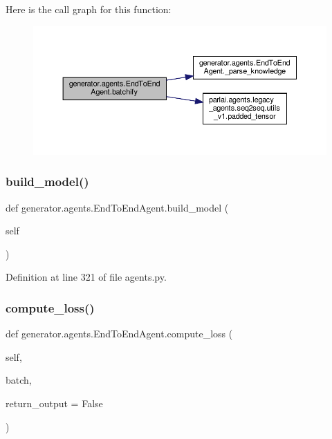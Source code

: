 Here is the call graph for this function\+:
\nopagebreak
\begin{figure}[H]
\begin{center}
\leavevmode
\includegraphics[width=350pt]{classgenerator_1_1agents_1_1EndToEndAgent_a91da888e366d029cb5efa373d4858e15_cgraph}
\end{center}
\end{figure}
\mbox{\label{classgenerator_1_1agents_1_1EndToEndAgent_a4350bfc0d04bf47814db2d14b95ac3bb}} 
\subsubsection{\texorpdfstring{build\+\_\+model()}{build\_model()}}
{\footnotesize\ttfamily def generator.\+agents.\+End\+To\+End\+Agent.\+build\+\_\+model (\begin{DoxyParamCaption}\item[{}]{self }\end{DoxyParamCaption})}



Definition at line 321 of file agents.\+py.

\mbox{\label{classgenerator_1_1agents_1_1EndToEndAgent_ae74fbbaf5e134c46d83a89ffe0e00dc1}} 
\subsubsection{\texorpdfstring{compute\+\_\+loss()}{compute\_loss()}}
{\footnotesize\ttfamily def generator.\+agents.\+End\+To\+End\+Agent.\+compute\+\_\+loss (\begin{DoxyParamCaption}\item[{}]{self,  }\item[{}]{batch,  }\item[{}]{return\+\_\+output = {\ttfamily False} }\end{DoxyParamCaption})}



